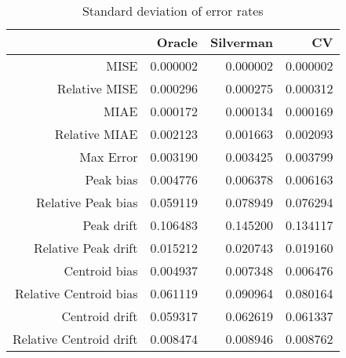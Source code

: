 \begin{table}[ht]
\centering
\begin{tabular}{rrrr}
  \hline
 & Oracle & Silverman & CV \\ 
  \hline
MISE & 0.000002 & 0.000002 & 0.000002 \\ 
  Relative MISE & 0.000296 & 0.000275 & 0.000312 \\ 
  MIAE & 0.000172 & 0.000134 & 0.000169 \\ 
  Relative MIAE & 0.002123 & 0.001663 & 0.002093 \\ 
  Max Error & 0.003190 & 0.003425 & 0.003799 \\ 
  Peak bias & 0.004776 & 0.006378 & 0.006163 \\ 
  Relative Peak bias & 0.059119 & 0.078949 & 0.076294 \\ 
  Peak drift & 0.106483 & 0.145200 & 0.134117 \\ 
  Relative Peak drift & 0.015212 & 0.020743 & 0.019160 \\ 
  Centroid bias & 0.004937 & 0.007348 & 0.006476 \\ 
  Relative Centroid bias & 0.061119 & 0.090964 & 0.080164 \\ 
  Centroid drift & 0.059317 & 0.062619 & 0.061337 \\ 
  Relative Centroid drift & 0.008474 & 0.008946 & 0.008762 \\ 
   \hline
\end{tabular}
\caption{Standard deviation of error rates} 
\label{tbl:stddev_error_rates}
\end{table}

